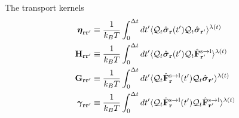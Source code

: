 \documentclass{beamer}
\begin{document}
\begin{frame}{The transport kernels}
\begin{align}
  \boldsymbol{\eta}_{{\bf  r}{\bf r}'} &\equiv
\frac{1}{k_BT}\int_0^{\Delta t} dt'\langle 
{\cal Q}_t\hat{\boldsymbol{\sigma}}_{{\bf r}}(t')
{\cal Q}_t\hat{\boldsymbol{\sigma}}_{{\bf r}'}\rangle^{\lambda(t)}
\nonumber \\
{\bf H}_{{\bf r}{\bf r}'}&\equiv\frac{1}{k_BT}\int_0^{\Delta t} dt'
\langle {\cal Q}_t\hat{\boldsymbol{\sigma}}_{{\bf r}}(t')
{\cal Q}_t\hat{\bf F}^{\rm s\to l}_{{\bf r}'}\rangle^{\lambda(t)}
\nonumber\\
{\bf G}_{{\bf r}{\bf r}'}&\equiv\frac{1}{k_BT}\int_0^{\Delta t} dt'
\langle {\cal Q}_t\hat{\bf F}^{\rm s\to l}_{{\bf r}}(t')
{\cal Q}_t\hat{\boldsymbol{\sigma}}_{{\bf r}'}\rangle^{\lambda(t)}
\nonumber\\
\boldsymbol{\gamma}_{{\bf  r}{\bf r}'}&\equiv\frac{1}{k_BT}\int_0^{\Delta t} dt'
\langle 
{\cal Q}_t\hat{\bf F}^{\rm s\to l}_{{\bf r}}(t')
{\cal Q}_t\hat{\bf F}^{\rm s\to l}_{{\bf r}'}\rangle^{\lambda(t)}
\nonumber
\end{align}
\end{frame}
\end{document}
